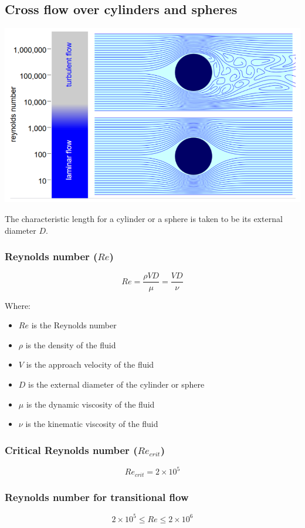 \documentclass[11pt]{article}
\begin{document}
\subsection{Cross flow over cylinders and spheres}
\label{sec:orgbd0c2f8}
\begin{center}
\includegraphics[width=.9\linewidth]{./images/cross-flow-over-cylinders-and-spheres-diagram.png}
\end{center}
The characteristic length for a cylinder or a sphere is taken to be its external diameter \(D\).
\subsubsection{Reynolds number (\(Re\))}
\label{sec:org0731fbb}
\[Re = \frac{\rho V D}{\mu} = \frac{VD}{\nu}\]

Where:
\begin{itemize}
\item \(Re\) is the Reynolds number
\item \(\rho\) is the density of the fluid
\item \(V\) is the approach velocity of the fluid
\item \(D\) is the external diameter of the cylinder or sphere
\item \(\mu\) is the dynamic viscosity of the fluid
\item \(\nu\) is the kinematic viscosity of the fluid
\end{itemize}
\subsubsection{Critical Reynolds number (\(Re_{crit}\))}
\label{sec:org9552e6c}
\[Re_{crit} = 2 \times 10^5\]
\subsubsection{Reynolds number for transitional flow}
\label{sec:org26412c8}
\[2 \times 10^5 \le Re \le 2 \times 10 ^6\]
\end{document}
